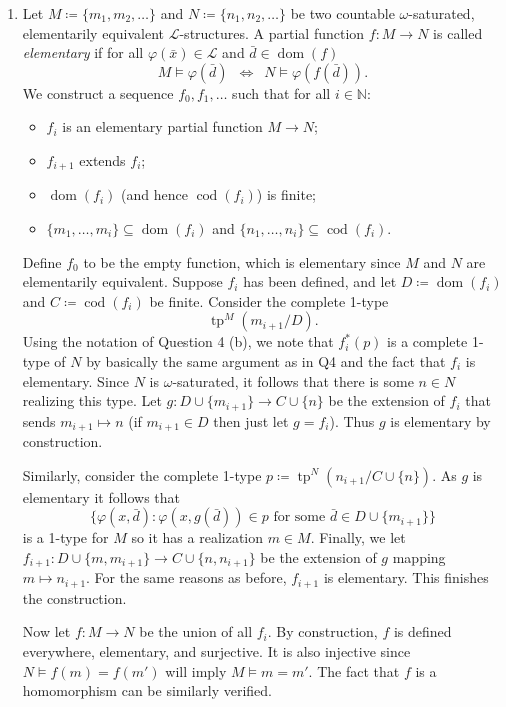 \documentclass{article}
\theoremstyle{theorem}
\DeclareMathOperator{\tp}{tp}
\DeclareMathOperator{\dom}{dom}
\DeclareMathOperator{\cod}{cod}
\begin{document}
\begin{enumerate}[leftmargin=*]
		\item Let $M \coloneqq \{m_1, m_2, \ldots\}$ and $N \coloneqq \{n_1,n_2,\ldots\}$ be two countable $\omega$-saturated, elementarily equivalent $\mathcal{L}$-structures. A partial function $f\colon M \to N$ is called \emph{elementary} if for all $\varphi(\bar{x})\in\mathcal{L}$ and $\bar{d}\in \dom(f)$
		\[
			M \models \varphi(\bar{d}) \,\,\,\iff\,\,\, N \models \varphi(f(\bar{d})).
		\]
		We construct a sequence $f_0,f_1,\ldots$ such that for all $i\in \mathbb{N}$:
		\begin{itemize}
			\item $f_i$ is an elementary partial function $M\to N$;
			\item $f_{i+1}$ extends $f_i$;
			\item $\dom(f_i)$ (and hence $\cod(f_i)$) is finite;
			\item $\{m_1,\ldots,m_i\}\subseteq \dom(f_i)$ and $\{n_1,\ldots,n_i\}\subseteq \cod(f_i)$.
		\end{itemize}
		
		Define $f_0$ to be the empty function, which is elementary since $M$ and $N$ are elementarily equivalent. Suppose $f_i$ has been defined, and let $D\coloneqq \dom(f_i)$ and $C\coloneqq \cod(f_i)$ be finite. Consider the complete 1-type
		\[
			\tp^M(m_{i+1}/D).
		\]
		Using the notation of Question 4 (b), we note that $f_i^*(p)$ is a complete 1-type of $N$ by basically the same argument as in Q4 and the fact that $f_i$ is elementary. Since $N$ is $\omega$-saturated, it follows that there is some $n\in N$ realizing this type. Let $g\colon D\cup\{m_{i+1}\} \to C\cup\{n\}$ be the extension of $f_i$ that sends $m_{i+1}\mapsto n$ (if $m_{i+1}\in D$ then just let $g=f_i$). Thus $g$ is elementary by construction.
		
		Similarly, consider the complete 1-type $p\coloneqq \tp^N(n_{i+1}/C\cup\{n\})$. As $g$ is elementary it follows that 
		\[\{\varphi(x,\bar{d}) \colon \varphi(x,g(\bar{d}))\in p\text{ for some $\bar{d}\in D\cup\{m_{i+1}\}$}\}\]
		is a 1-type for $M$ so it has a realization $m\in M$. Finally, we let $f_{i+1} \colon D\cup\{m,m_{i+1}\}\to C\cup\{n,n_{i+1}\}$ be the extension of $g$ mapping $m\mapsto n_{i+1}$. For the same reasons as before, $f_{i+1}$ is elementary. This finishes the construction.
		
		Now let $f\colon M \to N$ be the union of all $f_i$. By construction, $f$ is defined everywhere, elementary, and surjective. It is also injective since $N\models f(m) = f(m')$ will imply $M\models m = m'$. The fact that $f$ is a homomorphism can be similarly verified.
		\end{enumerate}
\end{document}
